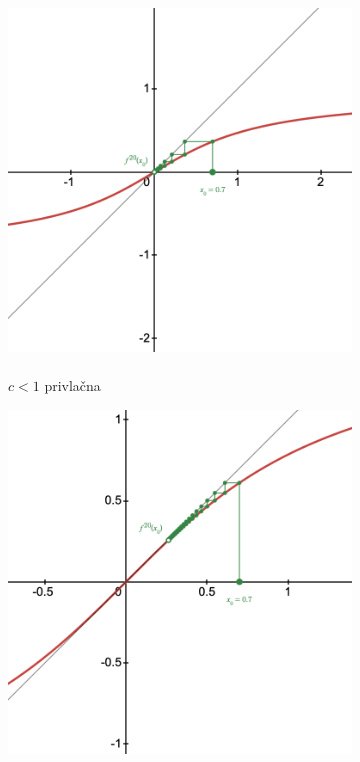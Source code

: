 \documentclass{article}
\begin{document}
\begin{figure}[h]
    \centering
    \begin{subfigure}[c]{0.28\textwidth}
        \centering
        \includegraphics[width=\textwidth]{Grafi/cobweb171.png}
        \caption{\\$c<1$ privlačna}
        \label{fig:cobweb31}
    \end{subfigure}
    \begin{subfigure}[c]{0.28\textwidth}
        \centering
        \includegraphics[width=\textwidth]{Grafi/cobweb172.png}

\end{subfigure}
\end{figure}
\end{document}
